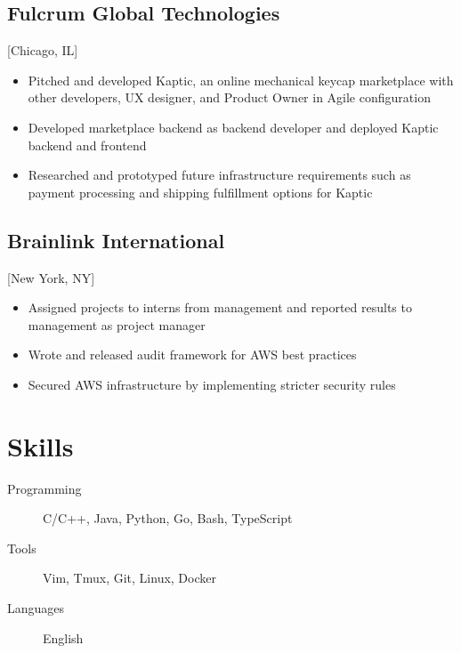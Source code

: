 \documentclass{mycv}
\begin{document}
\subsection{Fulcrum Global Technologies}[Chicago, IL]
\begin{positions}
\end{positions}
\begin{itemize}
  \item Pitched and developed Kaptic, an online mechanical keycap marketplace with other developers, UX designer, and Product Owner in Agile configuration
  \item Developed marketplace backend as backend developer and deployed Kaptic backend and frontend
  \item Researched and prototyped future infrastructure requirements such as payment processing and shipping fulfillment options for Kaptic
\end{itemize}

\subsection{Brainlink International}[New York, NY]
\begin{positions}
\end{positions}
\begin{itemize}
  \item Assigned projects to interns from management and reported results to management as project manager
  \item Wrote and released audit framework for AWS best practices
  \item Secured AWS infrastructure by implementing stricter security rules
\end{itemize}

\section{Skills}

\begin{description}
  \item[Programming] C/C++, Java, Python, Go, Bash, TypeScript
  \item[Tools] Vim, Tmux, Git, Linux, Docker
  \item[Languages] English
\end{description}
\end{document}
